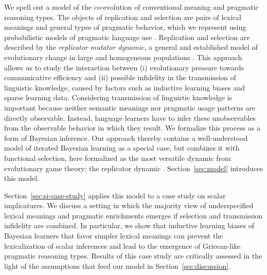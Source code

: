 \documentclass[a4paper, 11pt]{article}
\theoremstyle{Satz}
\begin{document}
We spell out a model of the co-evolution of conventional meaning and pragmatic reasoning
types. The objects of replication and selection are pairs of lexical meanings and general types
of pragmatic behavior, which we represent using probabilistic models of pragmatic language use
\citep{frank+goodman:2012,FrankeJager2015:Probabilistic-p,GoodmanFrank2016:Pragmatic-Langu}. Replication
and selection are described by the \emph{replicator mutator dynamic}, a general and established
model of evolutionary change in large and homogeneous populations
\citep{Hofbauer1985:The-Selection-M,nowak+etal:2000,NowakKomarova2001:Evolution-of-Un,hofbauer+sigmund:2003,Nowak2006:Evolutionary-Dy}. This
approach allows us to study the interaction between (i) evolutionary pressure towards
communicative efficiency and (ii) possible infidelity in the transmission of linguistic
knowledge, caused by factors such as inductive learning biases and sparse learning
data. Considering transmission of linguistic knowledge is important because neither semantic
meanings nor pragmatic usage patterns are directly observable. Instead, language learners have
to infer these unobservables from the observable behavior in which they result. We formalize
this process as a form of Bayesian inference. Our approach thereby contains a well-understood
model of iterated Bayesian learning \citep{griffiths+kalish:2007} as a special case, but
combines it with functional selection, here formalized as the most versatile dynamic from
evolutionary game theory; the replicator dynamic
\citep{TaylorJonker1978:Evolutionary-St}. Section~\ref{sec:model} introduces this model.

Section~\ref{sec:si-case-study} applies this model to a case study on scalar implicatures. We
discuss a setting in which the majority view of underspecified lexical meanings and pragmatic
enrichments emerges if selection and transmission infidelity are combined. In particular, we
show that inductive learning biases of Bayesian learners that favor simpler lexical meanings
can prevent the lexicalization of scalar inferences and lead to the emergence of Gricean-like
pragmatic reasoning types. Results of this case study are critically assessed in the light of
the assumptions that feed our model in Section~\ref{sec:discussion}.

\end{document}
